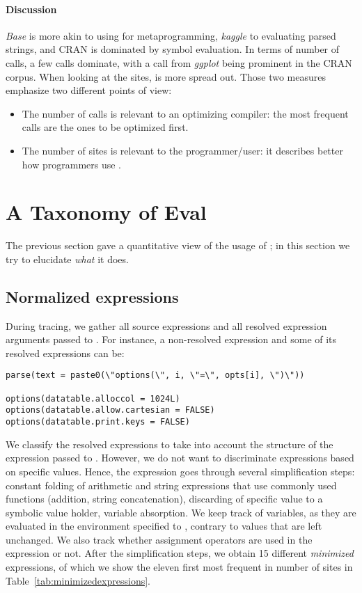 \documentclass[acmsmall]{acmart}
\begin{document}
\paragraph{Discussion} \emph{Base} is more akin to using \eval for metaprogramming, \emph{kaggle} to evaluating parsed strings, and CRAN is dominated by symbol evaluation. In terms of number of calls, a few calls dominate, with a call from \emph{ggplot} being prominent in the CRAN corpus. When looking at the \eval sites, \eval is more spread out. Those two measures emphasize two different points of view:

\begin{itemize}
	\item The number of calls is relevant to an optimizing compiler: the most frequent calls are the ones to be optimized first.
	\item The number of sites is relevant to the programmer/user: it describes better how programmers use \eval.
\end{itemize}



\section{A Taxonomy of Eval}

The previous section gave a quantitative view of the usage of \eval;
in this section we try to elucidate \emph{what} it does.

\subsection{Normalized expressions} During tracing, we gather all source expressions and all resolved expression arguments passed to \eval. For instance, a non-resolved expression and some of its resolved expressions can be:

\begin{lstlisting}
parse(text = paste0(\"options(\", i, \"=\", opts[i], \")\"))

options(datatable.alloccol = 1024L)
options(datatable.allow.cartesian = FALSE)
options(datatable.print.keys = FALSE)
\end{lstlisting}

We classify the resolved expressions to take into account the structure of the expression passed to \eval.
However, we do not want to discriminate expressions based on specific values. Hence, the expression goes through several simplification steps: constant folding of arithmetic and string expressions that use commonly used functions (addition, string concatenation), discarding of specific value to a symbolic value holder, variable absorption. We keep track of variables, as they are evaluated in the environment specified to \eval, contrary to values that are left unchanged. We also track whether assignment operators are used in the expression or not. After the simplification steps, we obtain 15 different \emph{minimized} expressions, of which we show the eleven first most frequent in number of sites in Table~\ref{tab:minimizedexpressions}.
\end{document}

